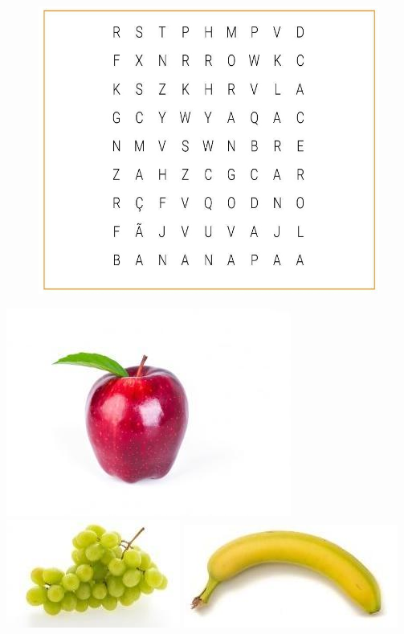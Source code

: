\begin{figure}[htpb!]
\includegraphics[width=\textwidth]{media/image97.jpg}
\end{figure}

\includegraphics[width=.3\textwidth]{media/image98.jpg}
\includegraphics[width=.3\textwidth]{media/image99.jpg}
\includegraphics[width=.3\textwidth]{media/image100.jpg}

